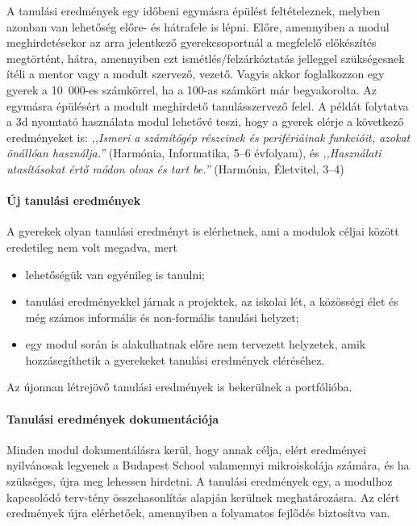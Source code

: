 A tanulási eredmények egy időbeni egymásra épülést feltételeznek, melyben azonban van lehetőség előre- és hátrafele is lépni. Előre, amennyiben a modul meghirdetésekor az arra jelentkező gyerekcsoportnál a megfelelő előkészítés megtörtént, hátra, amennyiben ezt ismétlés/felzárkóztatás jelleggel szükségesnek ítéli a mentor vagy a modult szervező, vezető. Vagyis akkor foglalkozzon egy gyerek a 10~000-es számkörrel, ha a 100-as számkört már begyakorolta. Az egymásra épülésért a modult meghirdető tanulásszervező felel. A példát folytatva a 3d nyomtató használata modul lehetővé teszi, hogy a gyerek elérje a következő eredményeket is: \emph{,,Ismeri a számítógép
      részeinek és perifériáinak funkcióit, azokat önállóan használja.''}
(Harmónia, Informatika, 5--6 évfolyam), és  \emph{,,Használati utasításokat
      értő módon olvas és tart be.''} (Harmónia, Életvitel, 3--4)

\paragraph{Új tanulási eredmények}

A gyerekek olyan tanulási eredményt is elérhetnek, ami a modulok céljai között eredetileg nem volt megadva, mert

\begin{itemize}
      \item lehetőségük van egyénileg is tanulni;

      \item tanulási eredményekkel járnak a projektek, az iskolai lét, a közösségi élet és még számos informális és non-formális tanulási helyzet;

      \item egy modul során is alakulhatnak előre nem tervezett helyzetek, amik hozzásegíthetik a gyerekeket tanulási eredmények eléréséhez.
\end{itemize}

Az újonnan létrejövő tanulási eredmények is bekerülnek a portfólióba.

\paragraph{Tanulási eredmények dokumentációja}

Minden modul dokumentálásra kerül, hogy annak célja, elért eredményei nyilvánosak legyenek a Budapest School valamennyi mikroiskolája számára, és ha szükséges, újra meg lehessen hirdetni. A tanulási eredmények egy, a modulhoz kapcsolódó terv-tény összehasonlítás alapján kerülnek meghatározásra. Az elért eredmények újra elérhetőek, amennyiben a folyamatos fejlődés biztosítva van.


